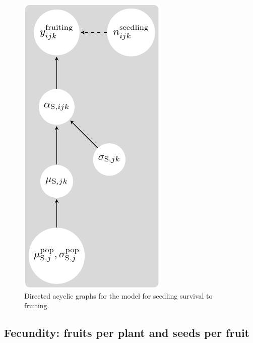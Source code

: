 \documentclass[12pt, oneside, titlepage]{article}   	%
\begin{document}
\begin{figure}
       \includegraphics[scale=1]{../../manuscript/figures/dag-survival.pdf}  
    \caption{ Directed acyclic graphs for the model for seedling survival to fruiting. }
 \label{fig:dag-survival}
\end{figure}


\clearpage

\subsection{Fecundity: fruits per plant and seeds per fruit}


\end{document}
